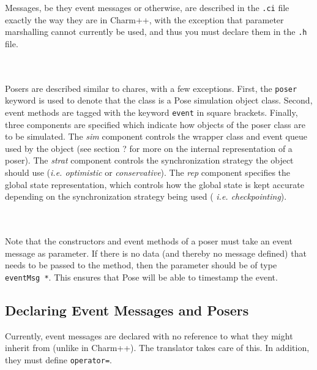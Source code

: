 \documentclass[10pt]{article}
\newcommand{\pose}{{\sc Pose}}
\begin{document}
Messages, be they event messages or otherwise, are described in the
{\tt .ci} file exactly the way they are in Charm++, with the exception
that parameter marshalling cannot currently be used, and thus you must declare
them in the {\tt .h} file.  

~\\
\\

Posers are described similar to chares, with a few exceptions.  First,
the {\tt poser} keyword is used to denote that the class is a \pose{}
simulation object class.  Second, event methods are tagged with the
keyword {\tt event} in square brackets. Finally, three components are
specified which indicate how objects of the poser class are to be
simulated.  The {\it sim} component controls the wrapper class and
event queue used by the object (see section ? for more on the internal
representation of a poser).  The {\it strat} component controls the
synchronization strategy the object should use ({\it i.e. optimistic}
or {\it conservative}).  The {\it rep} component specifies the global
state representation, which controls how the global state is kept
accurate depending on the synchronization strategy being used ({\it
i.e. checkpointing}).

~\\
\\

Note that the constructors and event methods of a poser must take an
event message as parameter.  If there is no data (and thereby no
message defined) that needs to be passed to the method, then the
parameter should be of type {\tt eventMsg *}.  This ensures that
\pose{} will be able to timestamp the event.

\subsection{Declaring Event Messages and Posers}

Currently, event messages are declared with no reference to what they
might inherit from (unlike in Charm++).  The translator takes care of
this. In addition, they must define {\tt operator=}.
\end{document}
